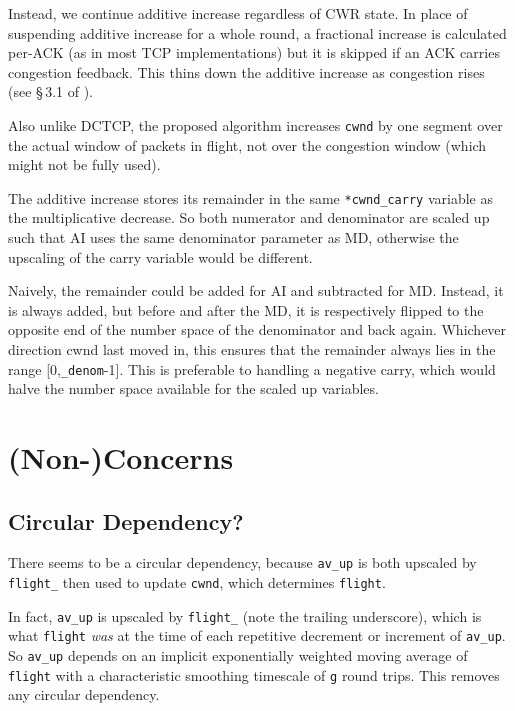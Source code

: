 Instead, we continue additive increase regardless of CWR state. In place of
suspending additive increase for a whole round, a fractional increase is
calculated per-ACK (as in most TCP implementations) but it is skipped if an ACK
carries congestion feedback. This thins down the additive increase as congestion
rises (see \S\,3.1 of \cite{Briscoe17a:CC_Tensions_TR}).

Also unlike DCTCP, the proposed algorithm increases \texttt{cwnd} by one segment
over the actual window of packets in flight, not over the congestion window
(which might not be fully used).

The additive increase stores its remainder in the same \texttt{*cwnd\_carry}
variable as the multiplicative decrease. So both numerator and denominator are
scaled up such that AI uses the same denominator parameter as MD, otherwise the
upscaling of the carry variable would be different.

Naively, the remainder could be added for AI and subtracted for MD. Instead, it is always added, but before and after the MD, it is respectively flipped to the opposite end of the number space of the denominator and back again. Whichever direction cwnd last moved in, this ensures that the remainder always lies in the range [0,\texttt{\_denom}-1].
This is preferable to handling a negative carry, which would halve the number
space available for the scaled up variables.

\section{(Non-)Concerns}\label{prresp_Non-Concerns}

\subsection{Circular Dependency?}\label{prresp_No_Circular_Dependency}

There seems to be a circular dependency, because \texttt{av\_up} is both
upscaled by \texttt{flight\_} then used to update \texttt{cwnd}, which
determines \texttt{flight}.

In fact, \texttt{av\_up} is upscaled by \texttt{flight\_} (note the trailing
underscore), which is what \texttt{flight} \emph{was} at the time of each
repetitive decrement or increment of \texttt{av\_up}. So \texttt{av\_up} depends
on an implicit exponentially weighted moving average of \texttt{flight} with a
characteristic smoothing timescale of \texttt{g} round trips. This removes any
circular dependency.


